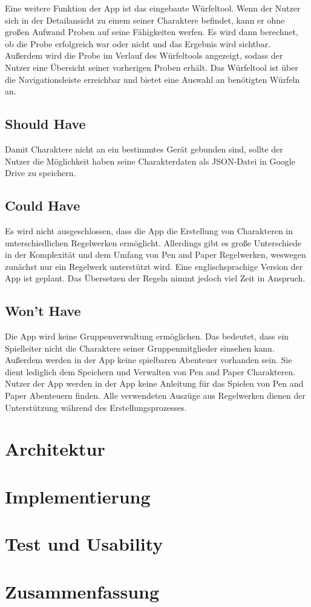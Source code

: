 Eine weitere Funktion der App ist das eingebaute Würfeltool. Wenn der Nutzer sich in der Detailansicht zu einem seiner Charaktere befindet, kann er ohne großen Aufwand Proben auf seine Fähigkeiten werfen. Es wird dann berechnet, ob die Probe erfolgreich war oder nicht und das Ergebnis wird sichtbar. Außerdem wird die Probe im Verlauf des Würfeltools angezeigt, sodass der Nutzer eine Übersicht seiner vorherigen Proben erhält. Das Würfeltool ist über die Navigationsleiste erreichbar und bietet eine Auswahl an benötigten Würfeln an.

\subsection{Should Have}
Damit Charaktere nicht an ein bestimmtes Gerät gebunden sind, sollte der Nutzer die Möglichkeit haben seine Charakterdaten als JSON-Datei in Google Drive zu speichern.

\subsection{Could Have}
Es wird nicht ausgeschlossen, dass die App die Erstellung von Charakteren in unterschiedlichen Regelwerken ermöglicht. Allerdings gibt es große Unterschiede in der Komplexität und dem Umfang von Pen and Paper Regelwerken, weswegen zunächst nur ein Regelwerk unterstützt wird. Eine englischsprachige Version der App ist geplant. Das Übersetzen der Regeln nimmt jedoch viel Zeit in Anspruch.

\subsection{Won't Have}
Die App wird keine Gruppenverwaltung ermöglichen. Das bedeutet, dass ein Spielleiter nicht die Charaktere seiner Gruppenmitglieder einsehen kann. Außerdem werden in der App keine spielbaren Abenteuer vorhanden sein. Sie dient lediglich dem Speichern und Verwalten von Pen and Paper Charakteren. Nutzer der App werden in der App keine Anleitung für das Spielen von Pen and Paper Abenteuern finden. Alle verwendeten Auszüge aus Regelwerken dienen der Unterstützung während des Erstellungsprozesses. 

\section{Architektur}

\section{Implementierung}

\section{Test und Usability}

\section{Zusammenfassung}